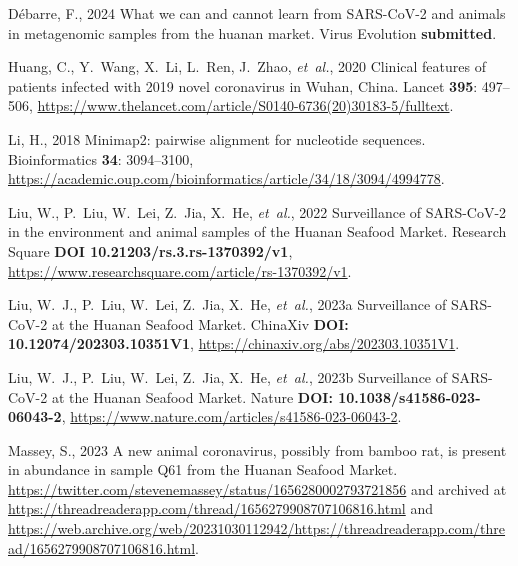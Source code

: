 \documentclass[9pt,onecolumn,twoside]{gsajnl_modified}
\begin{document}
{\begin{thebibliography}{17}
{D\'ebarre, F.}, 2024 What we can and cannot learn from {SARS-CoV-2} and
  animals in metagenomic samples from the huanan market. Virus Evolution {\bf
  submitted}.

{Huang, C., Y.~Wang, X.~Li, L.~Ren, J.~Zhao, {\em et~al.\/}}, 2020 Clinical
  features of patients infected with 2019 novel coronavirus in {Wuhan, China}.
  Lancet {\bf 395}: 497--506,
  \url{https://www.thelancet.com/article/S0140-6736(20)30183-5/fulltext}.

{Li, H.}, 2018 Minimap2: pairwise alignment for nucleotide sequences.
  Bioinformatics {\bf 34}: 3094--3100,
  \url{https://academic.oup.com/bioinformatics/article/34/18/3094/4994778}.

{Liu, W., P.~Liu, W.~Lei, Z.~Jia, X.~He, {\em et~al.\/}}, 2022 {Surveillance of
  SARS-CoV-2 in the environment and animal samples of the Huanan Seafood
  Market}. Research Square {\bf DOI 10.21203/rs.3.rs-1370392/v1},
  \url{https://www.researchsquare.com/article/rs-1370392/v1}.

{Liu, W.~J., P.~Liu, W.~Lei, Z.~Jia, X.~He, {\em et~al.\/}}, 2023{a}
  {Surveillance of SARS-CoV-2 at the Huanan Seafood Market}. ChinaXiv {\bf DOI:
  10.12074/202303.10351V1}, \url{https://chinaxiv.org/abs/202303.10351V1}.

{Liu, W.~J., P.~Liu, W.~Lei, Z.~Jia, X.~He, {\em et~al.\/}}, 2023{b}
  {Surveillance of SARS-CoV-2 at the Huanan Seafood Market}. Nature {\bf DOI:
  10.1038/s41586-023-06043-2},
  \url{https://www.nature.com/articles/s41586-023-06043-2}.

{Massey, S.}, 2023 A new animal coronavirus, possibly from bamboo rat, is
  present in abundance in sample {Q61} from the {Huanan Seafood Market}.
  \url{https://twitter.com/stevenemassey/status/1656280002793721856} and
  archived at \url{https://threadreaderapp.com/thread/1656279908707106816.html}
  and
  \url{https://web.archive.org/web/20231030112942/https://threadreaderapp.com/thread/1656279908707106816.html}.


\end{thebibliography}}
\end{document}
